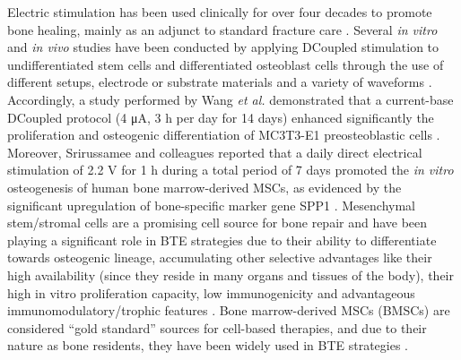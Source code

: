 Electric stimulation has been used clinically for over four decades to promote bone healing, mainly as an adjunct to standard fracture care \cite{Bassett1974-rb}. Several \textit{in vitro} and \textit{in vivo} studies have been conducted by applying DCoupled stimulation to undifferentiated stem cells and differentiated osteoblast cells through the use of different setups, electrode or substrate materials and a variety of waveforms \cite{Guillot-Ferriols2022-wn, Ryan2021-tq, Thrivikraman2018-su}. Accordingly, a study performed by Wang \textit{et al.} demonstrated that a current-base DCoupled protocol (4 \si{\micro\ampere}, 3 \si{\hour} per day for 14 days) enhanced significantly the proliferation and osteogenic differentiation of MC3T3-E1 preosteoblastic cells \cite{Wang2021-tm}. Moreover, Srirussamee and colleagues reported that a daily direct electrical stimulation of 2.2 \si{\volt} for 1 \si{\hour} during a total period of 7 days promoted the \textit{in vitro} osteogenesis of human bone marrow-derived \ac{MSCs}, as evidenced by the significant upregulation of bone-specific marker gene SPP1 \cite{Srirussamee2021-cj}. Mesenchymal stem/stromal cells are a promising cell source for bone repair and have been playing a significant role in \ac{BTE} strategies due to their ability to differentiate towards osteogenic lineage, accumulating other selective advantages like their high availability (since they reside in many organs and tissues of the body), their high in vitro proliferation capacity, low immunogenicity and advantageous immunomodulatory/trophic features \cite{Arthur2020-bs, Silva2020-sw}. Bone marrow-derived MSCs (BMSCs) are considered “gold standard” sources for cell-based therapies, and due to their nature as bone residents, they have been widely used in BTE strategies \cite{Rossi2023-od, Shang2021-ty, Silva2020-dc}. 

